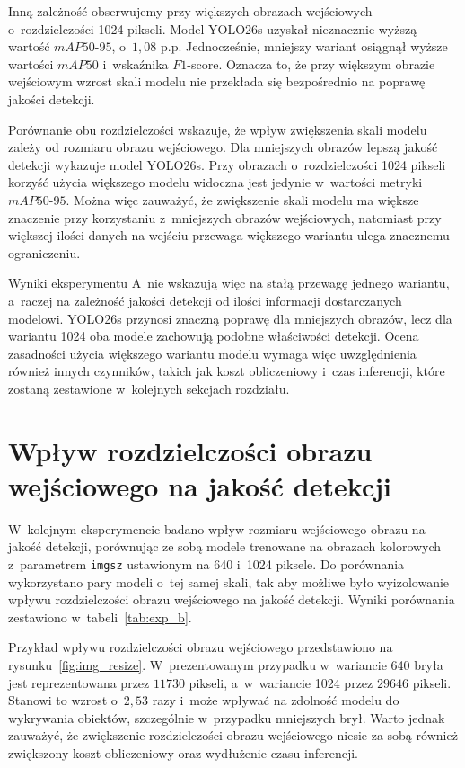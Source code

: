 Inną zależność obserwujemy przy większych obrazach wejściowych o~rozdzielczości 1024 pikseli. Model YOLO26s uzyskał nieznacznie wyższą wartość $mAP50\text{-}95$, o~$1,08$ p.p. Jednocześnie, mniejszy wariant osiągnął wyższe wartości $mAP50$ i~wskaźnika $F1$-score. Oznacza to, że przy większym obrazie wejściowym wzrost skali modelu nie przekłada się bezpośrednio na poprawę jakości detekcji.

Porównanie obu rozdzielczości wskazuje, że wpływ zwiększenia skali modelu zależy od rozmiaru obrazu wejściowego. Dla mniejszych obrazów lepszą jakość detekcji wykazuje model YOLO26s. Przy obrazach o~rozdzielczości 1024 pikseli korzyść użycia większego modelu widoczna jest jedynie w~wartości metryki $mAP50\text{-}95$. Można więc zauważyć, że zwiększenie skali modelu ma większe znaczenie przy korzystaniu z~mniejszych obrazów wejściowych, natomiast przy większej ilości danych na wejściu przewaga większego wariantu ulega znacznemu ograniczeniu.

Wyniki eksperymentu A~nie wskazują więc na stałą przewagę jednego wariantu, a~raczej na zależność jakości detekcji od ilości informacji dostarczanych modelowi. YOLO26s przynosi znaczną poprawę dla mniejszych obrazów, lecz dla wariantu 1024 oba modele zachowują podobne właściwości detekcji. Ocena zasadności użycia większego wariantu modelu wymaga więc uwzględnienia również innych czynników, takich jak koszt obliczeniowy i~czas inferencji, które zostaną zestawione w~kolejnych sekcjach rozdziału.

\section{Wpływ rozdzielczości obrazu wejściowego na jakość detekcji} %

W~kolejnym eksperymencie badano wpływ rozmiaru wejściowego obrazu na jakość detekcji, porównując ze sobą modele trenowane na obrazach kolorowych z~parametrem \texttt{imgsz} ustawionym na 640 i~1024 piksele. Do porównania wykorzystano pary modeli o~tej samej skali, tak aby możliwe było wyizolowanie wpływu rozdzielczości obrazu wejściowego na jakość detekcji. Wyniki porównania zestawiono w~tabeli~\ref{tab:exp_b}.

Przykład wpływu rozdzielczości obrazu wejściowego przedstawiono na rysunku~\ref{fig:img_resize}. W~prezentowanym przypadku w~wariancie 640 bryła jest reprezentowana przez $11730$ pikseli, a~w~wariancie 1024 przez $29646$ pikseli. Stanowi to wzrost o~$2,53$ razy i~może wpływać na zdolność modelu do wykrywania obiektów, szczególnie w~przypadku mniejszych brył. Warto jednak zauważyć, że zwiększenie rozdzielczości obrazu wejściowego niesie za sobą również zwiększony koszt obliczeniowy oraz wydłużenie czasu inferencji.

